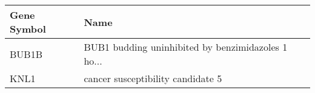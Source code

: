 \begin{tabular}{ll}
\toprule
Gene Symbol &                                               Name \\
\midrule
      BUB1B & BUB1 budding uninhibited by benzimidazoles 1 ho... \\
       KNL1 &                  cancer susceptibility candidate 5 \\
\bottomrule
\end{tabular}
